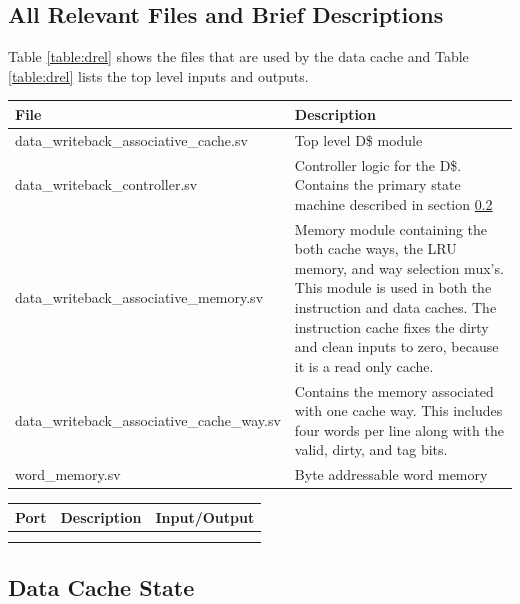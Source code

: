 
\subsection{All Relevant Files and Brief Descriptions}

	Table \ref{table:drel} shows the files that are used by the data cache and Table \ref{table:drel} lists the top level inputs and outputs.

	\begin{tabular}{|l|p{70mm}|}
	\hline File  & Description \\ 
	\hline  data\_writeback\_associative\_cache.sv & Top level D\$ module \\ 
	\hline  data\_writeback\_controller.sv & Controller logic for the D\$.
	Contains the primary state machine described in section \ref{sec:dstate} \\ 
	\hline  data\_writeback\_associative\_memory.sv & 
	Memory module containing the both cache ways, the LRU memory, and way selection mux's.
	This module is used in both the instruction and data caches.
	The instruction cache fixes the dirty and clean inputs to zero, because it is a read only cache.\\ 
	\hline  data\_writeback\_associative\_cache\_way.sv & 
	Contains the memory associated with one cache way. This includes four words per line along with the valid, dirty, and tag bits. \\ 
	\hline  word\_memory.sv & Byte addressable word memory  \\
	\hline
	\end{tabular} 
	\label{table:drel}

	\begin{tabular}{|l|p{60mm}|l|}
	\hline Port & Description & Input/Output \\ 
	\hline  &  &  \\ 
	\hline  &  &  \\ 
	\hline
	\end{tabular} 
	\label{table:dio}

\subsection{Data Cache State}
\label{sec:dstate}

